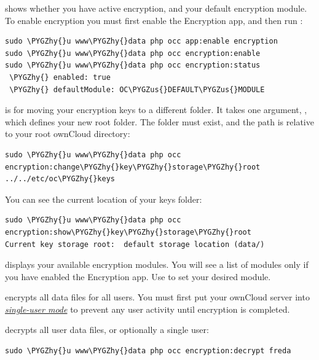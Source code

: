 \documentclass[letterpaper,10pt,english]{sphinxmanual}
\def\PYGZus{\char`\_}
\def\PYGZhy{\char`\-}
\begin{document}
 shows whether you have active encryption, and your default
encryption module. To enable encryption you must first enable the Encryption
app, and then run :

\begin{Verbatim}[commandchars=\\\{\}]
sudo \PYGZhy{}u www\PYGZhy{}data php occ app:enable encryption
sudo \PYGZhy{}u www\PYGZhy{}data php occ encryption:enable
sudo \PYGZhy{}u www\PYGZhy{}data php occ encryption:status
 \PYGZhy{} enabled: true
 \PYGZhy{} defaultModule: OC\PYGZus{}DEFAULT\PYGZus{}MODULE
\end{Verbatim}

 is for moving your encryption keys to a
different folder. It takes one argument, , which defines your new
root folder. The folder must exist, and the path is relative to your root ownCloud directory:

\begin{Verbatim}[commandchars=\\\{\}]
sudo \PYGZhy{}u www\PYGZhy{}data php occ encryption:change\PYGZhy{}key\PYGZhy{}storage\PYGZhy{}root ../../etc/oc\PYGZhy{}keys
\end{Verbatim}

You can see the current location of your keys folder:

\begin{Verbatim}[commandchars=\\\{\}]
sudo \PYGZhy{}u www\PYGZhy{}data php occ encryption:show\PYGZhy{}key\PYGZhy{}storage\PYGZhy{}root
Current key storage root:  default storage location (data/)
\end{Verbatim}

 displays your available encryption modules. You will
see a list of modules only if you have enabled the Encryption app. Use
 to set your desired module.

 encrypts all data files for all users. You must first
put your ownCloud server into {\hyperref[configuration_server/occ_command:maintenance-commands-label]{\emph{single-user
mode}}} to prevent any user activity until encryption
is completed.

 decrypts all user data files, or optionally a single
user:

\begin{Verbatim}[commandchars=\\\{\}]
sudo \PYGZhy{}u www\PYGZhy{}data php occ encryption:decrypt freda
\end{Verbatim}
\end{document}
